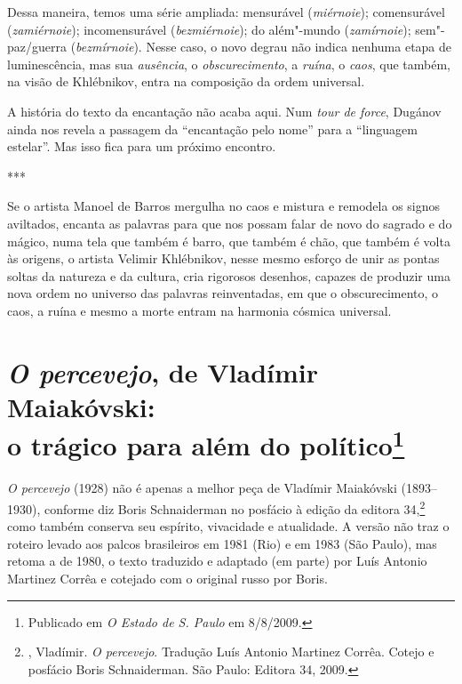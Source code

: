 Dessa maneira, temos uma série ampliada: mensurável (\emph{miérnoie});
comensurável (\emph{zamiérnoie}); incomensurável (\emph{bezmiérnoie});
do além"-mundo (\emph{zamírnoie}); sem"-paz/guerra (\emph{bezmírnoie}).
Nesse caso, o novo degrau não indica nenhuma etapa de luminescência, mas
sua \emph{ausência}, o \emph{obscurecimento}, a \emph{ruína}, o \emph{caos}, que também, na visão de
Khlébnikov, entra na composição da ordem universal.

A história do texto da encantação não acaba aqui. Num
\emph{tour de force}, Dugánov ainda nos revela a passagem da
``encantação pelo nome'' para a ``linguagem estelar''. Mas isso fica
para um próximo encontro.

\begin{center}
***
\end{center}

Se o artista Manoel de Barros mergulha no caos e mistura e remodela os
signos aviltados, encanta as palavras para que nos possam falar de novo
do sagrado e do mágico, numa tela que também é barro, que também é chão,
que também é volta às origens, o artista Velimir Khlébnikov, nesse mesmo
esforço de unir as pontas soltas da natureza e da cultura, cria
rigorosos desenhos, capazes de produzir uma nova ordem no universo das
palavras reinventadas, em que o obscurecimento, o caos, a ruína e mesmo
a morte entram na harmonia cósmica universal.


\chapter{\emph{O percevejo}, de Vladímir Maiakóvski:\\
o trágico para além do político\footnote{Publicado em \emph{O Estado de S.
Paulo} em 8/8/2009.}}
\label{percevejo}

\emph{O percevejo} (1928) não é apenas a melhor peça de Vladímir
Maiakóvski (1893--1930), conforme diz Boris Schnaiderman no posfácio à
edição da editora 34,\footnote{, Vladímir.
\emph{O percevejo}. Tradução Luís Antonio Martinez Corrêa. Cotejo
e posfácio Boris Schnaiderman. São Paulo: Editora 34, 2009.} como
também conserva seu espírito, vivacidade e atualidade. A versão
não traz o roteiro levado aos palcos brasileiros em 1981 (Rio)
e em 1983 (São Paulo), mas retoma a de 1980, o texto traduzido
e adaptado (em parte) por Luís Antonio Martinez Corrêa e cotejado
com o original russo por Boris.

